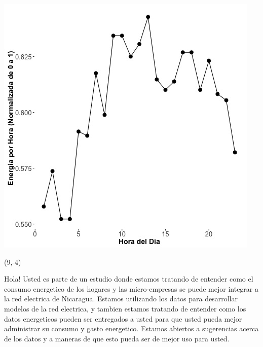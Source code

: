 \documentclass{article}\usepackage[]{graphicx}\usepackage[]{color}
\newenvironment{knitrout}{}{} %
\begin{document}
\begin{knitrout}
\color{fgcolor}
\includegraphics[scale=0.75]{figure/A18_fplot_norm_median} 
\end{knitrout}

 \begin{textblock}{1}(9,-4)
\begin{minipage}{20em}
\begingroup

\endgroup
\end{minipage}
\end{textblock}


\vspace{70px}
\begin{knitrout}
Hola! Usted es parte de un estudio donde estamos tratando de entender como el consumo energetico de los hogares y las micro-empresas se puede mejor integrar a la red electrica de Nicaragua. Estamos utilizando los datos para desarrollar modelos de la red electrica, y tambien estamos tratando de entender como los datos energeticos pueden ser entregados a usted para que usted pueda mejor administrar su consumo y gasto energetico.  Estamos abiertos a sugerencias acerca de los datos y a maneras de que esto pueda ser de mejor uso para usted.
\end{knitrout}
\end{document}

